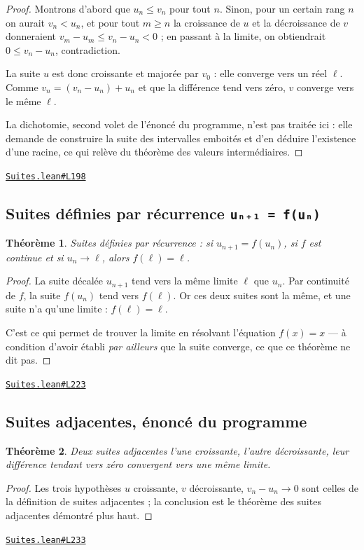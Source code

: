 \documentclass[11pt,a4paper]{article}
\theoremstyle{definition}
\theoremstyle{plain}
\newtheorem{theoreme}{Théorème}
\newcommand{\source}[2]{\par\smallskip\noindent\hfill{\footnotesize\href{#1}{\texttt{#2}}}\par\smallskip}
\begin{document}
\begin{proof}
Montrons d'abord que $u_n \le v_n$ pour tout $n$. Sinon, pour un certain rang $n$ on
aurait $v_n < u_n$, et pour tout $m \ge n$ la croissance de $u$ et la décroissance de $v$
donneraient $v_m - u_m \le v_n - u_n < 0$ ; en passant à la limite, on obtiendrait
$0 \le v_n - u_n$, contradiction.

La suite $u$ est donc croissante et majorée par $v_0$ : elle converge vers un réel $\ell$.
Comme $v_n = (v_n - u_n) + u_n$ et que la différence tend vers zéro, $v$ converge vers le
même $\ell$.

La dichotomie, second volet de l'énoncé du programme, n'est pas traitée ici : elle demande
de construire la suite des intervalles emboités et d'en déduire l'existence d'une racine,
ce qui relève du théorème des valeurs intermédiaires.
\end{proof}
\source{https://github.com/Commutator-IO/learn-lean/blob/main/courses/02-lycee/03-suites/Suites.lean\#L198}{Suites.lean\#L198}

\subsection{Suites définies par récurrence \texttt{uₙ₊₁ = f(uₙ)}}

\begin{theoreme}
Suites définies par récurrence : si $u_{n+1} = f(u_n)$, si $f$ est continue et si
$u_n \to \ell$, alors $f(\ell) = \ell$.
\end{theoreme}

\begin{proof}
La suite décalée $u_{n+1}$ tend vers la même limite $\ell$ que $u_n$. Par continuité de
$f$, la suite $f(u_n)$ tend vers $f(\ell)$. Or ces deux suites sont la même, et une suite
n'a qu'une limite : $f(\ell) = \ell$.

C'est ce qui permet de trouver la limite en résolvant l'équation $f(x) = x$ — à condition
d'avoir établi \emph{par ailleurs} que la suite converge, ce que ce théorème ne dit pas.
\end{proof}
\source{https://github.com/Commutator-IO/learn-lean/blob/main/courses/02-lycee/03-suites/Suites.lean\#L223}{Suites.lean\#L223}

\subsection{Suites adjacentes, énoncé du programme}

\begin{theoreme}
Deux suites adjacentes \textemdash{} l'une croissante, l'autre décroissante, leur
différence tendant vers zéro \textemdash{} convergent vers une même limite.
\end{theoreme}
\begin{proof}
Les trois hypothèses \textemdash{} $u$ croissante, $v$ décroissante, $v_n - u_n \to 0$
\textemdash{} sont celles de la définition de suites adjacentes ; la conclusion est le
théorème des suites adjacentes démontré plus haut.
\end{proof}
\source{https://github.com/Commutator-IO/learn-lean/blob/main/courses/02-lycee/03-suites/Suites.lean\#L233}{Suites.lean\#L233}
\end{document}
